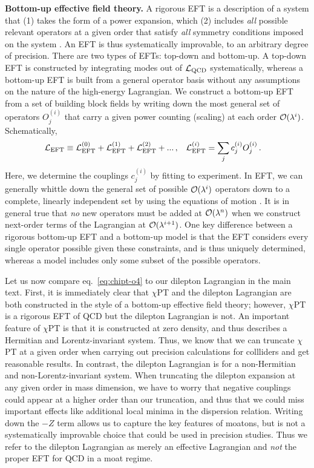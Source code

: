 \noindent \textbf{Bottom-up effective field theory.} 
A rigorous EFT is a description of a system that (1) takes the form of a power expansion, which (2) includes \textit{all} possible relevant operators at a given order that satisfy \textit{all} symmetry conditions imposed on the system \cite{Manohar:2018aog, Iain-EFT, Gross:2022hyw}. An EFT is thus systematically improvable, to an arbitrary degree of precision. There are two types of EFTs: top-down and bottom-up. A top-down EFT is constructed by integrating modes out of $\mathcal{L}_{\rm QCD}$ systematically, whereas a bottom-up EFT is built from a general operator basis without any assumptions on the nature of the high-energy Lagrangian. We construct a bottom-up EFT from a set of building block fields by writing down the most general set of operators $O_j^{(i)}$ that carry a given power counting (scaling) at each order $\mathcal{O}(\lambda^i)$. Schematically,
\begin{align}
	&\mathcal{L}_{\rm EFT} \equiv \mathcal{L}_{\rm EFT}^{(0)} + \mathcal{L}_{\rm EFT}^{(1)} + \mathcal{L}_{\rm EFT}^{(2)} + ...\,,
	&&\mathcal{L}^{(i)}_{\rm EFT} = \sum_{j} c_j^{(i)}O_j^{(i)}\,.
\end{align}
Here, we determine the couplings $c_j^{(i)}$ by fitting to experiment. 
In EFT, we can generally whittle down the general set of possible $\mathcal{O}(\lambda^i)$ operators down to a complete, linearly independent set by using the equations of motion \cite{Arzt:1993gz}. It is in general true that \textit{no} new operators must be added at $\mathcal{O}(\lambda^n)$ when we construct next-order terms of the Lagrangian at $\mathcal{O}(\lambda^{i+1})$. 
One key difference between a rigorous bottom-up EFT and a bottom-up model is that the EFT considers every single operator possible given these constraints, and is thus uniquely determined, whereas a model includes only some subset of the possible operators.\\



Let us now compare eq.~\eqref{eq:chipt-o4} to our dilepton Lagrangian in the main text. 
First, it is immediately clear that $\chi$PT and the dilepton Lagrangian are both constructed in the style of a bottom-up effective field theory; however, $\chi$PT is a rigorous EFT of QCD but the dilepton Lagrangian is not. 
An important feature of $\chi$PT is that it is constructed at zero density, and thus describes a Hermitian and Lorentz-invariant system. Thus, we know that we can truncate $\chi$PT at a given order when carrying out precision calculations for collliders and get reasonable results. In contrast, the dilepton Lagrangian is for a non-Hermitian and non-Lorentz-invariant system. When truncating the dilepton expansion at any given order in mass dimension, we have to worry that negative couplings could appear at a higher order than our truncation, and thus that we could miss important effects like additional local minima in the dispersion relation. Writing down the $-Z$ term allows us to  capture the key features of moatons, but is not a systematically improvable choice that could be used in precision studies. Thus we refer to the dilepton Lagrangian as merely an effective Lagrangian and \textit{not} the proper EFT for QCD in a moat regime.
 
